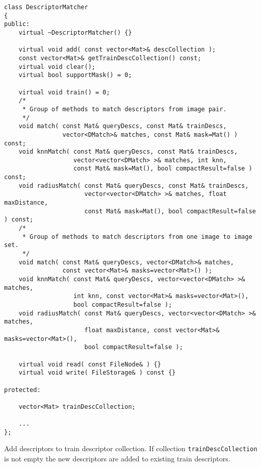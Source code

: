 \begin{lstlisting}
class DescriptorMatcher
{
public:
    virtual ~DescriptorMatcher() {}
    
    virtual void add( const vector<Mat>& descCollection );
    const vector<Mat>& getTrainDescCollection() const;
    virtual void clear();
    virtual bool supportMask() = 0;

    virtual void train() = 0;
    /*
     * Group of methods to match descriptors from image pair.
     */
    void match( const Mat& queryDescs, const Mat& trainDescs, 
                vector<DMatch>& matches, const Mat& mask=Mat() ) const;
    void knnMatch( const Mat& queryDescs, const Mat& trainDescs, 
                   vector<vector<DMatch> >& matches, int knn,
                   const Mat& mask=Mat(), bool compactResult=false ) const;
    void radiusMatch( const Mat& queryDescs, const Mat& trainDescs, 
                      vector<vector<DMatch> >& matches, float maxDistance,
                      const Mat& mask=Mat(), bool compactResult=false ) const;
    /*
     * Group of methods to match descriptors from one image to image set.
     */
    void match( const Mat& queryDescs, vector<DMatch>& matches,
                const vector<Mat>& masks=vector<Mat>() );
    void knnMatch( const Mat& queryDescs, vector<vector<DMatch> >& matches, 
                   int knn, const vector<Mat>& masks=vector<Mat>(), 
                   bool compactResult=false );
    void radiusMatch( const Mat& queryDescs, vector<vector<DMatch> >& matches, 
                      float maxDistance, const vector<Mat>& masks=vector<Mat>(), 
                      bool compactResult=false );

    virtual void read( const FileNode& ) {}
    virtual void write( FileStorage& ) const {}

protected:
   
    vector<Mat> trainDescCollection; 
    
    ...
};
\end{lstlisting} 

Add descriptors to train descriptor collection. If collection \texttt{trainDescCollection} is not empty
the new descriptors are added to existing train descriptors.


\begin{description}
\end{description}

